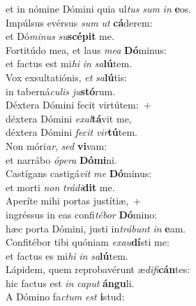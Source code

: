 \evenverse et in nómine Dómini quia ul\textit{tus} \textit{sum} \textit{in} \textbf{e}os.\\
\oddverse Impúlsus evérsus \textit{sum} \textit{ut} \textbf{cá}derem:~\*\\
\oddverse et Dó\textit{mi}\textit{nus} \textit{su}\textbf{scé}\textbf{pit} me.\\
\evenverse Fortitúdo mea, et laus \textit{me}\textit{a} \textbf{Dó}minus:~\*\\
\evenverse et factus est mi\textit{hi} \textit{in} \textit{sa}\textbf{lú}tem.\\
\oddverse Vox exsultatiónis, \textit{et} \textit{sa}\textbf{lú}tis:~\*\\
\oddverse in taberná\textit{cu}\textit{lis} \textit{ju}\textbf{stó}rum.\\
\evenverse Déxtera Dómini fecit virtútem:~+\\
\evenverse  déxtera Dómini \textit{e}\textit{xal}\textbf{tá}vit me,~\*\\
\evenverse déxtera Dómini \textit{fe}\textit{cit} \textit{vir}\textbf{tú}tem.\\
\oddverse Non móri\textit{ar}, \textit{sed} \textbf{vi}vam:~\*\\
\oddverse et narrábo \textit{ó}\textit{pe}\textit{ra} \textbf{Dó}\textbf{mi}ni.\\
\evenverse Castígans castigá\textit{vit} \textit{me} \textbf{Dó}minus:~\*\\
\evenverse et morti \textit{non} \textit{trá}\textit{di}\textbf{dit} me.\\
\oddverse Aperíte mihi portas justítiæ,~+\\
\oddverse  ingréssus in eas confi\textit{té}\textit{bor} \textbf{Dó}mino:~\*\\
\oddverse hæc porta Dómini, justi in\textit{trá}\textit{bunt} \textit{in} \textbf{e}am.\\
\evenverse Confitébor tibi quóniam \textit{e}\textit{xau}\textbf{dí}sti me:~\*\\
\evenverse et factus es mi\textit{hi} \textit{in} \textit{sa}\textbf{lú}tem.\\
\oddverse Lápidem, quem reprobavérunt æ\textit{di}\textit{fi}\textbf{cán}tes:~\*\\
\oddverse hic factus est \textit{in} \textit{ca}\textit{put} \textbf{án}\textbf{gu}li.\\
\evenverse A Dómino fa\textit{ctum} \textit{est} \textbf{i}stud:~\*\\
